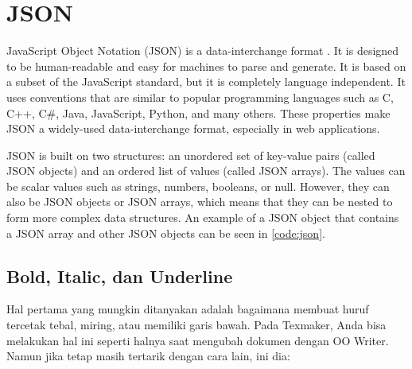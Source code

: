 \section{JSON}

JavaScript Object Notation (JSON) is a data-interchange format
\cite{ecma:json}. It is designed to be human-readable and easy for machines to
parse and generate. It is based on a subset of the JavaScript standard, but it
is completely language independent. It uses conventions that are similar to
popular programming languages such as C, C++, C\#, Java, JavaScript, Python,
and many others. These properties make JSON a widely-used data-interchange
format, especially in web applications.

JSON is built on two structures: an unordered set of key-value pairs (called
JSON objects) and an ordered list of values (called JSON arrays). The values
can be scalar values such as strings, numbers, booleans, or null. However, they
can also be JSON objects or JSON arrays, which means that they can be nested
to form more complex data structures. An example of a JSON object that contains
a JSON array and other JSON objects can be seen in \autoref{code:json}.



\subsection{Bold, Italic, dan Underline}
Hal pertama yang mungkin ditanyakan adalah bagaimana membuat huruf tercetak
tebal, miring, atau memiliki garis bawah. Pada Texmaker, Anda bisa melakukan
hal ini seperti halnya saat mengubah dokumen dengan OO Writer. Namun jika tetap
masih tertarik dengan cara lain, ini dia:


